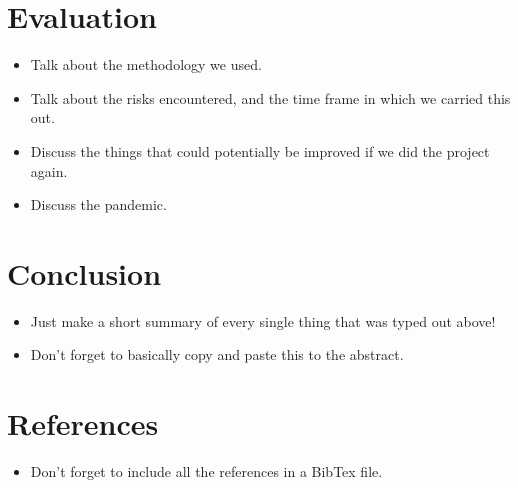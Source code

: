 \documentclass{article}
\begin{document}
\section{Evaluation}
\begin{itemize}
    \item Talk about the methodology we used.
    \item Talk about the risks encountered, and the time frame in which we carried this out.
    \item Discuss the things that could potentially be improved if we did the project again.
    \item Discuss the pandemic.
\end{itemize}

\section{Conclusion}
\begin{itemize}
    \item Just make a short summary of every single thing that was typed out above!
    \item Don't forget to basically copy and paste this to the abstract.
\end{itemize}

\section{References}
\begin{itemize}
    \item Don't forget to include all the references in a BibTex file.
\end{itemize}
\end{document}
